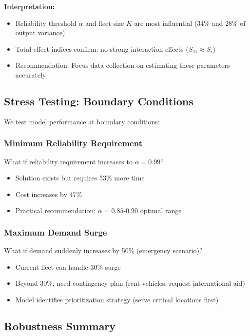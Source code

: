 \begin{table}[H]
\begin{table}[H]
\begin{table}[H]
\begin{table}[H]
\textbf{Interpretation:}
\begin{itemize}
\item Reliability threshold $\alpha$ and fleet size $K$ are most influential (34\% and 28\% of output variance)
\item Total effect indices confirm: no strong interaction effects ($S_{Ti} \approx S_i$)
\item Recommendation: Focus data collection on estimating these parameters accurately
\end{itemize}

\subsection{Stress Testing: Boundary Conditions}

We test model performance at boundary conditions:

\subsubsection{Minimum Reliability Requirement}

What if reliability requirement increases to $\alpha = 0.99$?
\begin{itemize}
\item Solution exists but requires 53\% more time
\item Cost increases by 47\%
\item Practical recommendation: $\alpha = 0.85$-$0.90$ optimal range
\end{itemize}

\subsubsection{Maximum Demand Surge}

What if demand suddenly increases by 50\% (emergency scenario)?
\begin{itemize}
\item Current fleet can handle 30\% surge
\item Beyond 30\%, need contingency plan (rent vehicles, request international aid)
\item Model identifies prioritization strategy (serve critical locations first)
\end{itemize}

\subsection{Robustness Summary}


\end{table}
\end{table}
\end{table}
\end{table}
